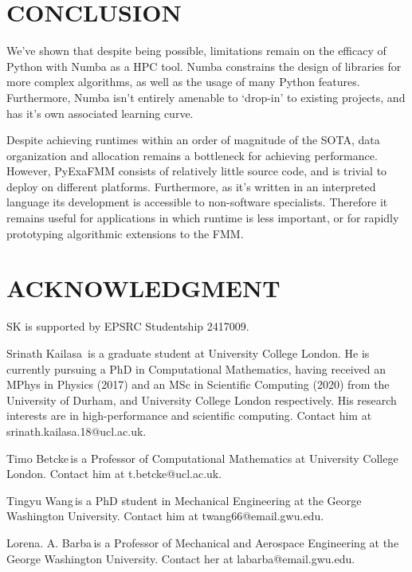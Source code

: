 \documentclass{IEEEcsmag}
\begin{document}
\section{CONCLUSION}

We've shown that despite being possible, limitations remain on the efficacy of Python with Numba as a HPC tool. Numba constrains the design of libraries for more complex algorithms, as well as the usage of many Python features. Furthermore, Numba isn't entirely amenable to `drop-in' to existing projects, and has it's own associated learning curve.

Despite achieving runtimes within an order of magnitude of the SOTA, data organization and allocation remains a bottleneck for achieving performance. However, PyExaFMM consists of relatively little source code, and is trivial to deploy on different platforms. Furthermore, as it's written in an interpreted language its development is accessible to non-software specialists. Therefore it remains useful for applications in which runtime is less important, or for rapidly prototyping algorithmic extensions to the FMM.

\section{ACKNOWLEDGMENT}

SK is supported by EPSRC Studentship 2417009.




\begin{IEEEbiography}{Srinath Kailasa}{\,} is a graduate student at University College London. He is currently pursuing a PhD in Computational Mathematics, having received an MPhys in Physics (2017) and an MSc in Scientific Computing (2020) from the University of Durham, and University College London respectively. His research interests are in high-performance and scientific computing. Contact him at srinath.kailasa.18@ucl.ac.uk.
\end{IEEEbiography}

\begin{IEEEbiography}{Timo Betcke}{\,}is a Professor of Computational Mathematics at University College London. Contact him at t.betcke@ucl.ac.uk.
\end{IEEEbiography}

\begin{IEEEbiography}{Tingyu Wang}{\,}is a PhD student in Mechanical Engineering at the George Washington University. Contact him at twang66@email.gwu.edu.
\end{IEEEbiography}

\begin{IEEEbiography}{Lorena. A. Barba}{\,}is a Professor of Mechanical and Aerospace Engineering at the George Washington University.  Contact her at labarba@email.gwu.edu.
\end{IEEEbiography}
\end{document}
